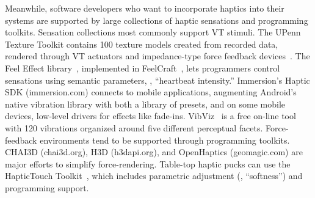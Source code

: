 Meanwhile, software developers who want to incorporate haptics into their systems are supported by large collections of haptic sensations and programming toolkits.
Sensation collections most commonly support VT stimuli. 
The UPenn Texture Toolkit contains 100 texture models created from recorded data, rendered through VT actuators and impedance-type force feedback devices~\citep{Culbertson2014}.
The Feel Effect library~\citep{Israr2014}, implemented in FeelCraft~\citep{SchneiderAsiaHaptics2014}, lets programmers control sensations using semantic parameters, \eg, ``heartbeat intensity.''
Immersion's Haptic SDK (immersion.com) connects to mobile applications, augmenting Android's native vibration library with both a library of presets, and on some mobile devices, low-level drivers for effects like fade-ins.
VibViz~\citep{Seifi2015} is a free on-line tool with 120 vibrations organized around five different perceptual facets.
Force-feedback environments tend to be supported through programming toolkits.
CHAI3D (chai3d.org), H3D (h3dapi.org), and OpenHaptics (geomagic.com) are major efforts to simplify force-rendering.
Table-top haptic pucks can use the HapticTouch Toolkit~\citep{Ledo2012}, which includes parametric adjustment (\eg, ``softness'') and programming support.

